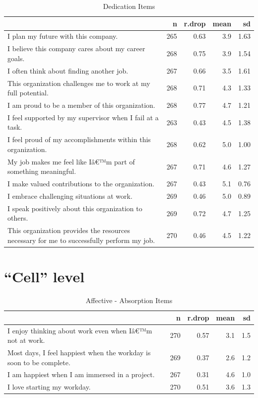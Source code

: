 \documentclass[
]{book}
\begin{document}
\begin{table}

\caption{\label{tab:rdrop6}Dedication Items}
\centering
\begin{tabular}[t]{l|r|r|r|r}
\hline
  & n & r.drop & mean & sd\\
\hline
I plan my future with this company. & 265 & 0.63 & 3.9 & 1.63\\
\hline
I believe this company cares about my career goals. & 268 & 0.75 & 3.9 & 1.54\\
\hline
I often think about finding another job. & 267 & 0.66 & 3.5 & 1.61\\
\hline
This organization challenges me to work at my full potential. & 268 & 0.71 & 4.3 & 1.33\\
\hline
I am proud to be a member of this organization. & 268 & 0.77 & 4.7 & 1.21\\
\hline
I feel supported by my supervisor when I fail at a task. & 263 & 0.43 & 4.5 & 1.38\\
\hline
I feel proud of my accomplishments within this organization. & 268 & 0.62 & 5.0 & 1.00\\
\hline
My job makes me feel like Iâ€™m part of something meaningful. & 267 & 0.71 & 4.6 & 1.27\\
\hline
I make valued contributions to the organization. & 267 & 0.43 & 5.1 & 0.76\\
\hline
I embrace challenging situations at work. & 269 & 0.46 & 5.0 & 0.89\\
\hline
I speak positively about this organization to others. & 269 & 0.72 & 4.7 & 1.25\\
\hline
This organization provides the resources necessary for me to successfully perform my job. & 270 & 0.46 & 4.5 & 1.22\\
\hline
\end{tabular}
\end{table}

\hypertarget{cell-level}{%
\section{``Cell'' level}\label{cell-level}}

\begin{table}

\caption{\label{tab:rdrop7}Affective - Absorption Items}
\centering
\begin{tabular}[t]{l|r|r|r|r}
\hline
  & n & r.drop & mean & sd\\
\hline
I enjoy thinking about work even when Iâ€™m not at work. & 270 & 0.57 & 3.1 & 1.5\\
\hline
Most days, I feel happiest when the workday is soon to be complete. & 269 & 0.37 & 2.6 & 1.2\\
\hline
I am happiest when I am immersed in a project. & 267 & 0.31 & 4.6 & 1.0\\
\hline
I love starting my workday. & 270 & 0.51 & 3.6 & 1.3\\
\hline
\end{tabular}
\end{table}
\end{document}
